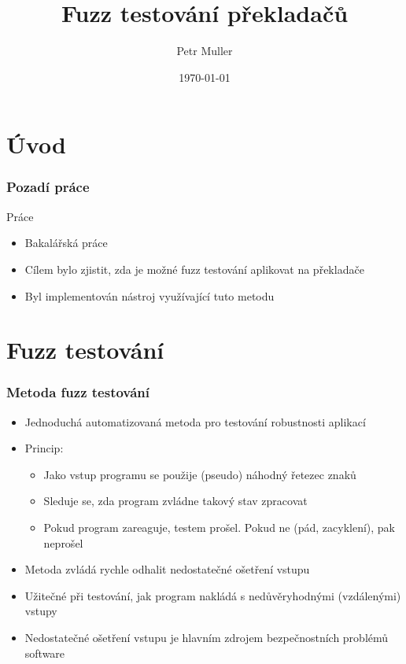 \documentclass{beamer}
\title{Fuzz testování překladačů}
\author{Petr Muller}
\date{\today}
\begin{document}
\frame{\titlepage}

\section[Obsah]{}
\frame{\tableofcontents}
\section{Úvod}
\frame
{
  \frametitle{Pozadí práce}
  \begin{block}{Práce}
  \begin{itemize}
    \item Bakalářská práce
    \item Cílem bylo zjistit, zda je možné fuzz testování aplikovat na překladače
    \item Byl implementován nástroj využívající tuto metodu
  \end{itemize}
  \end{block}
}

\section{Fuzz testování}
\frame
{
  \frametitle{Metoda fuzz testování}
  \begin{itemize}
    \item Jednoduchá automatizovaná metoda pro testování robustnosti aplikací
    \item Princip: \begin{itemize}
      \item Jako vstup programu se použije (pseudo) náhodný řetezec znaků
      \item Sleduje se, zda program zvládne takový stav zpracovat
      \item Pokud program zareaguje, testem prošel. Pokud ne (pád, zacyklení), pak neprošel
      \end{itemize}
    \item Metoda zvládá rychle odhalit nedostatečné ošetření vstupu
    \item Užitečné při testování, jak program nakládá s nedůvěryhodnými (vzdálenými) vstupy
    \item Nedostatečné ošetření vstupu je hlavním zdrojem bezpečnostních problémů software
  \end{itemize}
}
\end{document}

